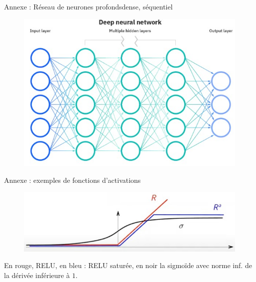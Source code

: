 \documentclass{beamer}
\begin{document}
\begin{frame}{Annexe : Réseau de neurones profonds}{dense, séquentiel}
    \begin{figure}
    \centering
        \includegraphics[height=.75\textheight]{images/deep_neural_network.jpg}
    \end{figure}
\end{frame}

\begin{frame}{Annexe : exemples de fonctions d'activations}
    \begin{figure}
    \centering
        \includegraphics[width=\textwidth]{images/activations.jpg}
    \end{figure}
    En rouge, RELU, en bleu : RELU saturée, en noir la sigmoïde avec norme inf. de la dérivée inférieure à $1$.
\end{frame}
\end{document}
